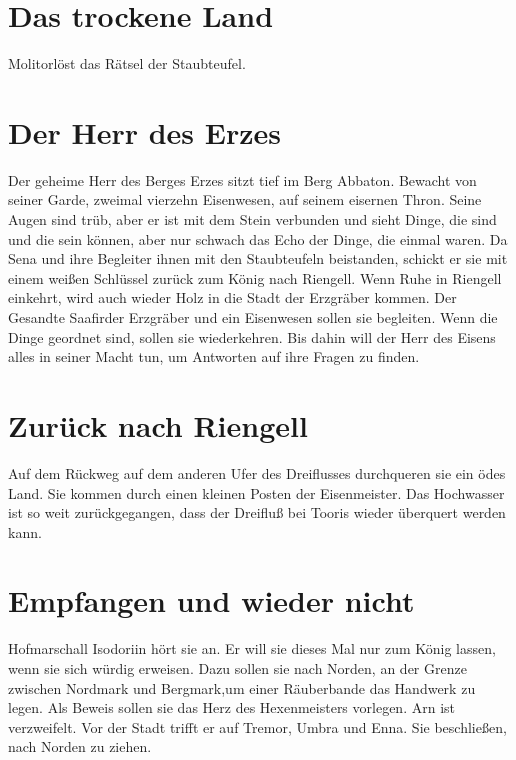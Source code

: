 \documentclass[12pt,a4paper,onecolumn,twoside,ngerman]{book}
\newcommand{\Molitor}{Molitor}
\newcommand{\Sena}{Sena}
\newcommand{\Umbra}{Umbra}
\newcommand{\Enna}{Enna}
\newcommand{\Tremor}{Tremor}
\newcommand{\Nordmark}{Nordmark}
\newcommand{\Bergmark}{Bergmark}
\newcommand{\Arn}{Arn}
\newcommand{\Rhingell}{Riengell}
\newcommand{\Isodoriin}{Isodoriin}
\newcommand{\Dreifluss}{Dreifluß}
\newcommand{\Toris}{Tooris}
\newcommand{\Eisenmeister}{Eisenmeister}
\newcommand{\Abaton}{Abbaton}
\newcommand{\Safir}{Saafir}
\newcommand{\Staubteufel}{Staubteufel}
\begin{document}
\section{Das trockene Land}
{\Molitor}löst das Rätsel der {\Staubteufel}.

\section{Der Herr des Erzes}
Der geheime Herr des Berges Erzes sitzt tief im Berg {\Abaton}. Bewacht von seiner Garde, zweimal vierzehn Eisenwesen, auf seinem eisernen Thron. Seine Augen sind trüb, aber er ist mit dem Stein verbunden und sieht Dinge, die sind und die sein können, aber nur schwach das Echo der Dinge, die einmal waren.\linebreak
Da {\Sena} und ihre Begleiter ihnen mit den Staubteufeln beistanden, schickt er sie mit einem weißen Schlüssel zurück zum König nach {\Rhingell}. Wenn Ruhe in {\Rhingell} einkehrt, wird auch wieder Holz in die Stadt der Erzgräber kommen. Der Gesandte \Safir der Erzgräber und ein Eisenwesen sollen sie begleiten.\linebreak
Wenn die Dinge geordnet sind, sollen sie wiederkehren. Bis dahin will der Herr des Eisens alles in seiner Macht tun, um Antworten auf ihre Fragen zu finden.

\section{Zurück nach {\Rhingell}}
Auf dem Rückweg auf dem anderen Ufer des Dreiflusses durchqueren sie ein ödes Land. Sie kommen durch einen kleinen Posten der {\Eisenmeister}.\linebreak 
Das Hochwasser ist so weit zurückgegangen, dass der {\Dreifluss} bei {\Toris} wieder überquert werden kann.


\section{Empfangen und wieder nicht}
Hofmarschall {\Isodoriin} hört sie an. Er will sie dieses Mal nur zum König lassen, wenn sie sich würdig erweisen. Dazu sollen sie nach Norden, an der Grenze zwischen {\Nordmark} und {\Bergmark},um einer Räuberbande das Handwerk zu legen. Als Beweis sollen sie das Herz des Hexenmeisters vorlegen.\linebreak
{\Arn} ist verzweifelt. Vor der Stadt trifft er auf {\Tremor}, {\Umbra} und {\Enna}. Sie beschließen, nach Norden zu ziehen.
\end{document}
